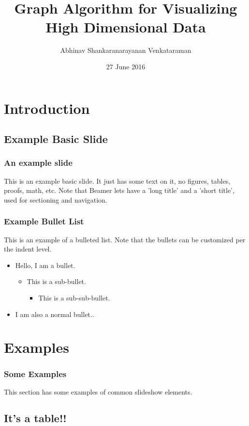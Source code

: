 \documentclass{beamer}
\title{Graph Algorithm for  Visualizing High Dimensional Data}
\author{Abhinav Shankaranarayanan Venkataraman}
\institute{Universitat Politècnica de Catalunya (UPC), Barcelona}
\date{27 June 2016}
\begin{document}
\frame{\titlepage}

\section[Outline]{}
\frame{\tableofcontents}

\section{Introduction}
\subsection[Basic Slide]{Example Basic Slide}

\frame
{
	\frametitle{An example slide}
	
	This is an example basic slide. It just has some text on it, no figures, tables, proofs, math, etc.  Note that Beamer lets have a 'long title' and a 'short title', used for sectioning and navigation.
}

\frame
{
	\frametitle{Example Bullet List}

	This is an example of a bulleted list. Note that the bullets can be customized per the indent level.
	
	\begin{itemize}
	\item Hello, I am a bullet.
	\begin{itemize}
		\item This is a sub-bullet.
		\begin{itemize}
			\item This is a sub-sub-bullet.
		\end{itemize}
	\end{itemize}
	\vspace{\baselineskip}
	\item I am also a normal bullet..
	\end{itemize}
}

\section{Examples}

\frame
{
	\frametitle{Some Examples}

	This section has some examples of common slideshow elements.
}

\subsection{It's a table!!}
\end{document}
